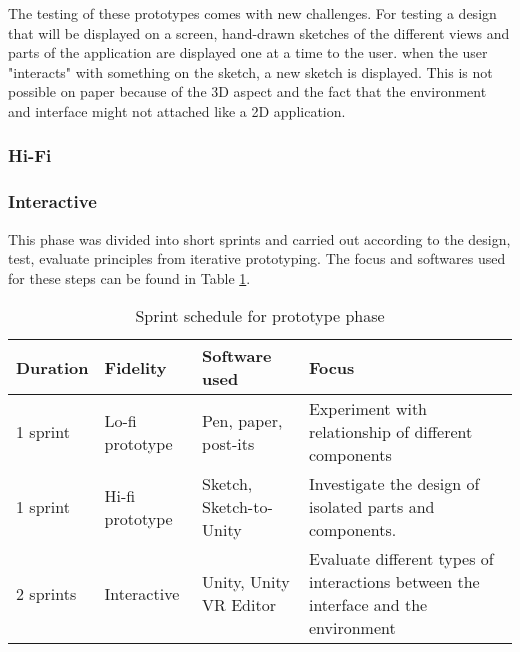 The testing of these prototypes comes with new challenges. For testing a design that will be displayed on a screen, hand-drawn sketches of the different views and parts of the application are displayed one at a time to the user. when the user "interacts" with something on the sketch, a new sketch is displayed. This is not possible on paper because of the 3D aspect and the fact that the environment and interface might not attached like a 2D application.
\subsubsection{Hi-Fi}
\label{method:prototype:hifi}
\subsubsection{Interactive}
\label{method:prototype:interactive}
This phase was divided into short sprints and carried out according to the design, test, evaluate principles from iterative prototyping.\cite{proto:hartson2012ux} The focus and softwares used for these steps can be found in Table \ref{table:sprints}.

\begin{table}[]
  \centering
  \caption{Sprint schedule for prototype phase}
  \label{table:sprints}
  \begin{tabular}{|l|l|l| p{5cm}|}
     \hline
    \textbf{Duration} & \textbf{Fidelity} & \textbf{Software used} & \textbf{Focus} \\\hline
    1 sprint                         & Lo-fi prototype  & Pen, paper, post-its    & Experiment with relationship of different components                               \\\hline
    1 sprint                        & Hi-fi prototype & Sketch, Sketch-to-Unity & Investigate the design of isolated parts and components.                           \\\hline
    2 sprints                 & Interactive   & Unity, Unity VR Editor  & Evaluate different types of interactions between the interface and the environment  \\\hline
  \end{tabular}
\end{table}
